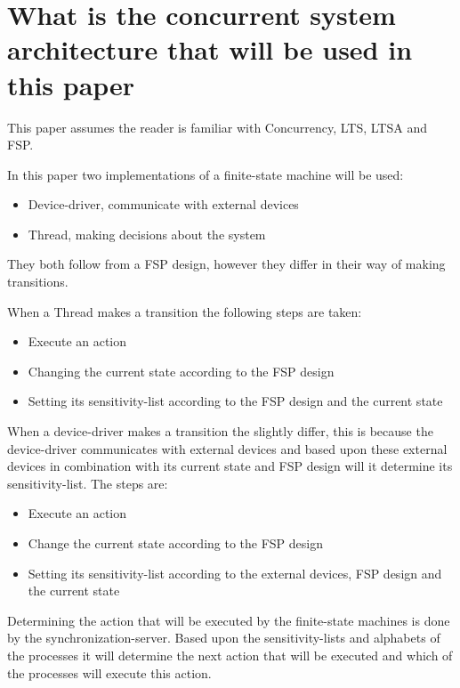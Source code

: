 \hypertarget{what-is-the-concurrent-system-architecture-that-will-be-used-in-this-paper}{%
\section{What is the concurrent system architecture that will be used in
this
paper}\label{what-is-the-concurrent-system-architecture-that-will-be-used-in-this-paper}}

This paper assumes the reader is familiar with Concurrency, LTS, LTSA
and FSP.

In this paper two implementations of a finite-state machine will be
used:

\begin{itemize}
\tightlist
\item
  Device-driver, communicate with external devices
\item
  Thread, making decisions about the system
\end{itemize}

They both follow from a FSP design, however they differ in their way of
making transitions.

When a Thread makes a transition the following steps are taken:

\begin{itemize}
\tightlist
\item
  Execute an action
\item
  Changing the current state according to the FSP design
\item
  Setting its sensitivity-list according to the FSP design and the
  current state
\end{itemize}

When a device-driver makes a transition the slightly differ, this is
because the device-driver communicates with external devices and based
upon these external devices in combination with its current state and
FSP design will it determine its sensitivity-list. The steps are:

\begin{itemize}
\tightlist
\item
  Execute an action
\item
  Change the current state according to the FSP design
\item
  Setting its sensitivity-list according to the external devices, FSP
  design and the current state
\end{itemize}

Determining the action that will be executed by the finite-state
machines is done by the synchronization-server. Based upon the
sensitivity-lists and alphabets of the processes it will determine the
next action that will be executed and which of the processes will
execute this action.

